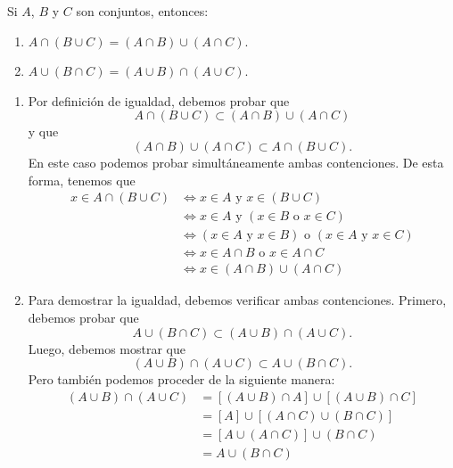 \begin{prop}{}{}
    Si $A$, $B$ y $C$ son conjuntos, entonces:
    \begin{enumerate}[label=\roman*., topsep=6pt, itemsep=0pt]
        \item $A \cap(B \cup C) = (A \cap B) \cup(A \cap C)$.
        \item $A \cup(B \cap C) = (A \cup B) \cap(A \cup C)$.
    \end{enumerate}
    \tcblower
    \demostracion
    \begin{enumerate}[label=\roman*., topsep=6pt, itemsep=0pt]
        \item Por definición de igualdad, debemos probar que
        $$A \cap(B \cup C) \subset(A \cap B) \cup(A \cap C)$$
        y que
        $$(A \cap B) \cup(A \cap C) \subset A \cap(B \cup C).$$
        En este caso podemos probar simultáneamente ambas contenciones. De esta forma, tenemos que
        \begin{align*}
            x \in A \cap(B \cup C) & \Longleftrightarrow x \in A \text { y } x \in(B \cup C) \\ 
            & \Longleftrightarrow x \in A \text { y }(x \in B \text { o } x \in C) \\ 
            & \Longleftrightarrow (x \in A \text { y } x \in B) \text { o }(x \in A \text { y } x \in C) \\ 
            & \Longleftrightarrow x \in A \cap B \text { o } x \in A \cap C \\ 
            & \Longleftrightarrow x \in(A \cap B) \cup(A \cap C)
        \end{align*}
        \item Para demostrar la igualdad, debemos verificar ambas contenciones. Primero, debemos probar que
        $$A \cup(B \cap C) \subset (A \cup B) \cap (A \cup C).$$
        Luego, debemos mostrar que
        $$(A \cup B) \cap (A \cup C) \subset A \cup(B \cap C).$$
        Pero también podemos proceder de la siguiente manera:
        \begin{align*}
            (A \cup B) \cap(A \cup C) & =[(A \cup B) \cap A] \cup[(A \cup B) \cap C] \\
            & =[A] \cup[(A \cap C) \cup(B \cap C)] \\
            & =[A \cup(A \cap C)] \cup(B \cap C) \\
            & =A \cup(B \cap C)
        \end{align*}
    \end{enumerate}
\end{prop}

